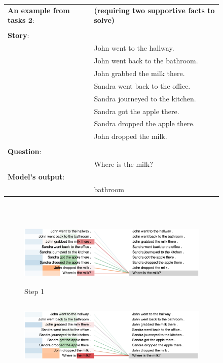 \begin{figure}[!h]
\begin{minipage}{\textwidth}
\fontsize{8}{8}\selectfont
\begin{tabular}{l l}
\textbf{An example from tasks 2}: & \textbf{(requiring two supportive facts to solve)}\\
\\
\textbf{Story}: & \\
& John went to the hallway. \\
& John went back to the bathroom. \\
& John grabbed the milk there. \\
& Sandra went back to the office. \\
& Sandra journeyed to the kitchen. \\
& Sandra got the apple there. \\
& Sandra dropped the apple there. \\
& John dropped the milk. \\
\\
\textbf{Question}: & \\
& Where is the milk? \\
\textbf{Model's output}: & \\
& bathroom
\end{tabular}
\end{minipage}
\\ \vfill
\vspace{20pt} %
\begin{minipage}{\textwidth}
    \centering
    \begin{subfigure}[t]{\textwidth}
        \centering
        \includegraphics[height=1.3in]{04-part-03/chapter-06/figs_and_tables/figs_attention_babi/e3-step1}
        \caption{Step 1}
    \end{subfigure}%
    \hfill \hfill
    \begin{subfigure}[t]{\textwidth}
        \centering
        \includegraphics[height=1.3in]{04-part-03/chapter-06/figs_and_tables/figs_attention_babi/e3-step2}

\end{subfigure}
\end{minipage}
\end{figure}
